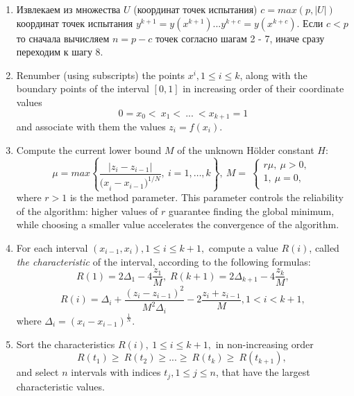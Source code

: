 \documentclass[runningheads]{llncs}
\begin{document}
\begin{enumerate}
	
	\item Извлекаем из множества $U$ (координат точек испытания) $c = max(p, |U|)$ координат точек испытания $y^{k+1}=y\left(x^{k+1}\right) ... y^{k+c}=y\left(x^{k+c}\right)$. Если $c < p$ то сначала вычисляем $n = p - c$ точек согласно шагам 2 - 7, иначе сразу переходим к шагу 8.	
	
	\item Renumber (using subscripts) the points $x^i, 1\leq i\leq k$,  along with the boundary points of the interval $[0, 1]$ in increasing order of their coordinate values
	\begin{equation} 
		\label{agp1_sort} 	0=x_0<\ x_1<\ ...\ <x_{k+1}=1 	
	\end{equation} 
	and associate with them the values $z_i=f(x_i)$. 
	
	\item  Compute the current lower bound $M$ of the unknown Hölder constant $H$: 
	\begin{equation} 
		\label{agp2_mu} 	\mu=max\left\{\frac{|z_i-z_{i-1}|}{{{(x}_i-x_{i-1})}^{1/N}},\ i=1,\ldots,k\right\},\ M=\  \left\{\begin{matrix}r\mu,\ \mu>0,\\1,\ \mu=0,\\\end{matrix}\right.\ 	
	\end{equation} 
	where $r>1$ is the method parameter. This parameter controls the reliability of the algorithm: higher values of $r$ guarantee finding the global minimum, while choosing a smaller value accelerates the convergence of the algorithm.
	
	\item  For each interval $(x_{i-1},x_i), 1\leq i\leq k+1,$ compute a value $R(i)$, called \textit{the characteristic} of the interval, according to the following formulas:
	\begin{equation} 
		\label{agp3_R1} R(1)=2\Delta_1-4\dfrac{z_1}{M}, \; R(k+1)=2\Delta_{k+1}-4\dfrac{z_k}{M}, 
	\end{equation} 
	\begin{equation} 
		\label{agp3_Ri} R(i)=\Delta_i+\dfrac{(z_i-z_{i-1})^2}{M^2\Delta_i}-2\dfrac{z_i+z_{i-1}}{M},1<i<k+1, 
	\end{equation} 
	where \(\Delta_i=(x_i-x_{i-1})^\frac{1}{N}\).
	
	\item   Sort the characteristics  $R\left(i\right),\ 1\leq i \leq k+1,$  in non-increasing order
	\begin{equation} 
		\label{agp4_R_sort} 	R\left(t_1\right)\geq\ R\left(t_2\right)\geq...\geq\ R\left(t_k\right)\geq\ R(t_{k+1}),\  
	\end{equation} 
and select $n$ intervals with indices $t_j, 1 \le j \le n$, that have the largest characteristic values.	
	

\end{enumerate}
\end{document}
